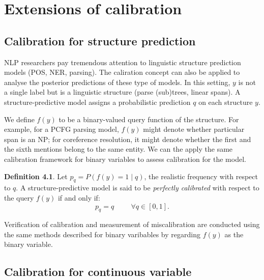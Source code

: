 \chapter{Extensions of calibration}

\section{Calibration for structure prediction}

NLP researchers pay tremendous attention to linguistic structure prediction models (POS, NER, parsing). The caliration concept can also be applied to analyse the posterior predictions of these type of models. In this setting, $y$ is not a single label but is a linguistic structure (parse (sub)trees, linear spans). A structure-predictive model assigns a probabilistic prediction $q$ on each structure $y$. 

We define $f(y)$ to be a binary-valued query function of the structure. For example, for a PCFG parsing model, $f(y)$ might denote whether particular span is an NP; for coreference resolution, it might denote whether the first and the sixth mentions belong to the same entity. We can the apply the same calibration framework for binary variables to assess calibration for the model. 

\textbf{Definition 4.1}. Let $p_q = P(f(y) = 1 \mid q)$, the realistic frequency with respect to $q$. A structure-predictive model is said to be \textit{perfectly calibrated} with respect to the query $f(y)$ if and only if:
$$p_q = q \hspace{1cm} \forall q \in [0, 1].$$  

Verification of calibration and measurement of miscalibration are conducted using the same methods described for binary varibables by regarding $f(y)$ as the binary variable. 

\section{Calibration for continuous variable}

